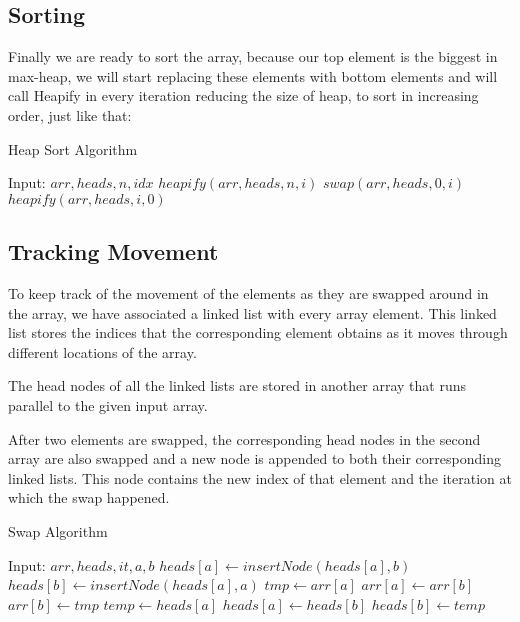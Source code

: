 \documentclass[letterpaper, 11 pt, conference]{ieeeconf}  %
\begin{document}
\subsection{Sorting}
Finally we are ready to sort the array, because our top element is the biggest in max-heap, we will start replacing these elements with bottom elements and will call Heapify in every iteration reducing the size of heap, to sort in increasing order, just like that:

\begin{algorithm}[H]
\caption{Heap Sort Algorithm}\label{alg:heapSort}
\begin{algorithmic}
\State Input: $arr, heads, n, idx$
	\State $heapify(arr, heads, n, i)$
\EndFor
{}
	\State $swap(arr, heads, 0, i)$
	\State $heapify(arr, heads, i, 0)$
\EndFor
\end{algorithmic}
\end{algorithm}

\subsection{Tracking Movement}
To keep track of the movement of the elements as they are swapped around in the array, we have associated a linked list with every array element. This linked list stores the indices that the corresponding element obtains as it moves through different locations of the array.

The head nodes of all the linked lists are stored in another array that runs parallel to the given input array.

After two elements are swapped, the corresponding head nodes in the second array are also swapped and a new node is appended to both their corresponding linked lists. This node contains the new index of that element and the iteration at which the swap happened.

\begin{algorithm}
\caption{Swap Algorithm}\label{alg:swap}
\begin{algorithmic}
\State Input: $arr, heads, it, a, b$
\State $heads[a] \gets insertNode(heads[a], b)$
\State $heads[b] \gets insertNode(heads[a], a)$
\State $tmp \gets arr[a]$
\State $arr[a] \gets arr[b]$
\State $arr[b] \gets tmp$
\State $temp \gets heads[a]$
\State $heads[a] \gets heads[b]$
\State $heads[b] \gets temp$
\end{algorithmic}
\end{algorithm}
\end{document}
